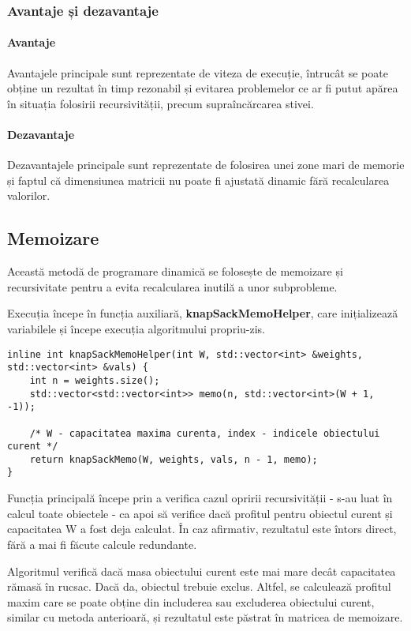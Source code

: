 \documentclass[runningheads]{llncs}
\begin{document}
\subsubsection{Avantaje și dezavantaje}

\paragraph{Avantaje} Avantajele principale sunt reprezentate de viteza de execuție, întrucât se poate
obține un rezultat în timp rezonabil și evitarea problemelor ce ar fi putut apărea în situația
folosirii recursivității, precum supraîncărcarea stivei.

\paragraph{Dezavantaje} Dezavantajele principale sunt reprezentate de folosirea unei zone mari de
memorie și faptul că dimensiunea matricii nu poate fi ajustată dinamic fără recalcularea valorilor.


\subsection{Memoizare}
Această metodă de programare dinamică se folosește de memoizare și recursivitate pentru
a evita recalcularea inutilă a unor subprobleme.

Execuția începe în funcția auxiliară, \textbf{knapSackMemoHelper}, care inițializează variabilele
și începe execuția algoritmului propriu-zis.

\begin{lstlisting}
inline int knapSackMemoHelper(int W, std::vector<int> &weights, std::vector<int> &vals) {
	int n = weights.size();
	std::vector<std::vector<int>> memo(n, std::vector<int>(W + 1, -1));

	/* W - capacitatea maxima curenta, index - indicele obiectului curent */
	return knapSackMemo(W, weights, vals, n - 1, memo);
}
\end{lstlisting}

Funcția principală începe prin a verifica cazul opririi recursivității - s-au
luat în calcul toate obiectele - ca apoi să verifice dacă profitul pentru obiectul
curent și capacitatea W a fost deja calculat. În caz afirmativ, rezultatul este întors
direct, fără a mai fi făcute calcule redundante.

Algoritmul verifică dacă masa obiectului curent este mai mare decât capacitatea rămasă
în rucsac. Dacă da, obiectul trebuie exclus. Altfel, se calculează profitul maxim care
se poate obține din includerea sau excluderea obiectului curent, similar cu metoda anterioară,
și rezultatul este păstrat în matricea de memoizare.
\end{document}
